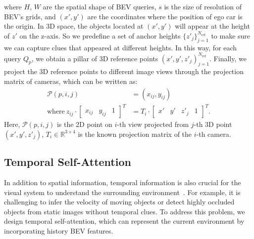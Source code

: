 \documentclass{article}
\begin{document}
where $H$, $W$ are the spatial shape of BEV queries, $s$ is the size of resolution  of BEV's grids, and $(x',y')$ are the coordinates where the position of ego car is the origin. In 3D space, the objects located at $(x', y')$ will appear at the height of $z'$ on the z-axis. So we predefine a set of anchor heights $\{z'_j\}_{j=1}^{N_\text{ref}}$ to make sure we can capture clues that appeared at different heights.  
In this way, for each query $Q_p$, we obtain a pillar of 3D reference points ${(x', y', z'_j)}_{j=1}^{{N_\text{ref}}}$. Finally, we project the 3D reference points to different image views through the projection  matrix of cameras, which can be written as:
\begin{equation}
\begin{split}
\label{project}
\mathcal{P}(p,i,j)& = (x_{ij},y_{ij})\\
\text{where}\ z_{ij}\cdot\begin{bmatrix} x_{ij} &y_{ij} & 1 \end{bmatrix}^T&= T_i \cdot \begin{bmatrix} x' &y' &z'_j & 1 \end{bmatrix}^T .
\end{split}
\end{equation}
Here, $\mathcal{P}(p,i,j)$ is the 2D point on $i$-th view projected from $j$-th 3D point $(x', y', z'_j)$, $T_i\!\in\! \mathbb{R}^{3\!\times\! 4}$ is the known projection  matrix of the $i$-th camera. 






\subsection{Temporal Self-Attention}\label{temporal_attention}
In addition to spatial information, temporal information is also crucial for the visual system to understand the surrounding environment~\cite{ma20223d}. 
For example, it is challenging to infer the velocity of moving objects or detect highly occluded objects from static images without temporal clues.
To address this problem, we design temporal self-attention, which can represent the current environment by incorporating history BEV features.
\end{document}
